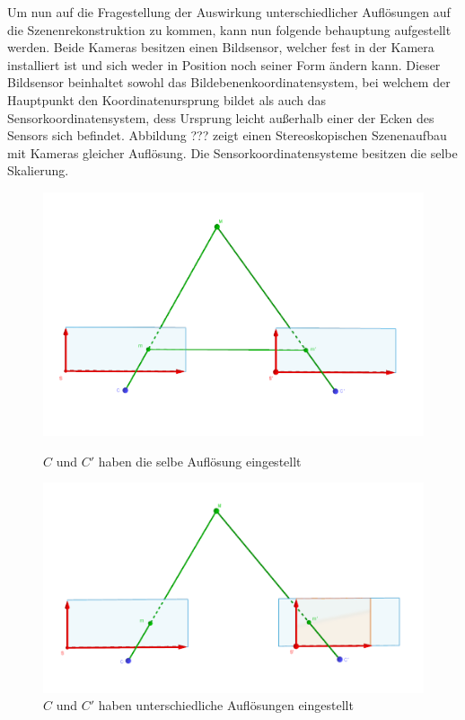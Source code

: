 Um nun auf die Fragestellung der Auswirkung unterschiedlicher Auflösungen auf die Szenenrekonstruktion zu kommen, kann nun folgende behauptung aufgestellt werden. Beide Kameras besitzen einen Bildsensor, welcher fest in der Kamera installiert ist und sich weder in Position noch seiner Form ändern kann. Dieser Bildsensor beinhaltet sowohl das Bildebenenkoordinatensystem, bei welchem der Hauptpunkt den Koordinatenursprung bildet als auch das Sensorkoordinatensystem, dess Ursprung leicht außerhalb einer der Ecken des Sensors sich befindet. Abbildung ??? zeigt einen Stereoskopischen Szenenaufbau mit Kameras gleicher Auflösung. Die Sensorkoordinatensysteme besitzen die selbe Skalierung. 
\pagebreak
\begin{figure}[!htb]
	\includegraphics[width=\linewidth]{images/SensorSelbeAufloesung.png}
	\caption{$C$ und $C'$ haben die selbe Auflösung eingestellt}
	\label{fig:awesome_image1}
	\endminipage\hfill
	\includegraphics[width=\linewidth]{images/SensorUnterschiedlicheAufloesung.png}
	\caption{$C$ und $C'$ haben unterschiedliche Auflösungen eingestellt}
	\label{fig:awesome_image2}
	\endminipage\hfill
\end{figure}


